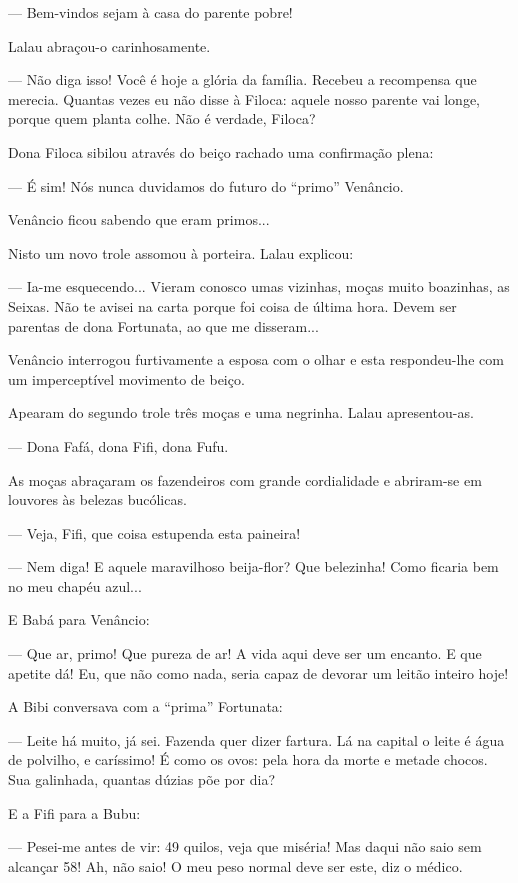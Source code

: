 --- Bem-vindos sejam à casa do parente pobre!

Lalau abraçou-o carinhosamente.

--- Não diga isso! Você é hoje a glória da família. Recebeu a recompensa
que merecia. Quantas vezes eu não disse à Filoca: aquele nosso parente
vai longe, porque quem planta colhe. Não é verdade, Filoca?

Dona Filoca sibilou através do beiço rachado uma confirmação plena:

--- É sim! Nós nunca duvidamos do futuro do ``primo'' Venâncio.

Venâncio ficou sabendo que eram primos...

Nisto um novo trole assomou à porteira. Lalau explicou:

--- Ia-me esquecendo... Vieram conosco umas vizinhas, moças muito
boazinhas, as Seixas. Não te avisei na carta porque foi coisa de última
hora. Devem ser parentas de dona Fortunata, ao que me disseram...

Venâncio interrogou furtivamente a esposa com o olhar e esta
respondeu-lhe com um imperceptível movimento de beiço.

Apearam do segundo trole três moças e uma negrinha. Lalau apresentou-as.

--- Dona Fafá, dona Fifi, dona Fufu.

As moças abraçaram os fazendeiros com grande cordialidade e abriram-se
em louvores às belezas bucólicas.

--- Veja, Fifi, que coisa estupenda esta paineira!

--- Nem diga! E aquele maravilhoso beija-flor? Que belezinha! Como
ficaria bem no meu chapéu azul...

E Babá para Venâncio:

--- Que ar, primo! Que pureza de ar! A vida aqui deve ser um encanto. E
que apetite dá! Eu, que não como nada, seria capaz de devorar um leitão
inteiro hoje!

A Bibi conversava com a ``prima'' Fortunata:

--- Leite há muito, já sei. Fazenda quer dizer fartura. Lá na capital o
leite é água de polvilho, e caríssimo! É como os ovos: pela hora da
morte e metade chocos. Sua galinhada, quantas dúzias põe por dia?

E a Fifi para a Bubu:

--- Pesei-me antes de vir: 49 quilos, veja que miséria! Mas daqui não
saio sem alcançar 58! Ah, não saio! O meu peso normal deve ser este, diz
o médico.

